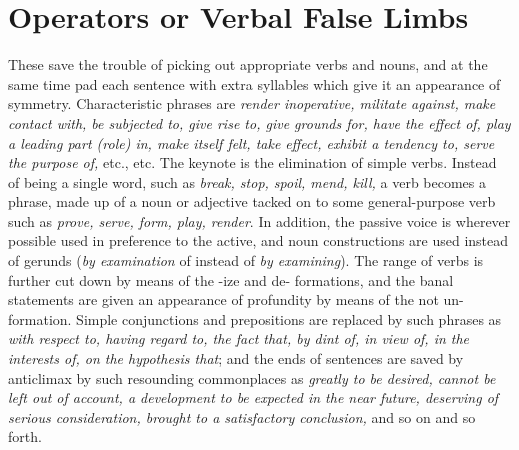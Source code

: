 \documentclass[12pt]{article}
\begin{document}
\section*{Operators or Verbal False Limbs} These save the trouble of picking out appropriate verbs and nouns, and at the same time pad each sentence with extra syllables which give it an appearance of symmetry. Characteristic phrases are \textit{render inoperative, militate against, make contact with, be subjected to, give rise to, give grounds for, have the effect of, play a leading part (role) in, make itself felt, take effect, exhibit a tendency to, serve the purpose of,} etc., etc. The keynote is the elimination of simple verbs. Instead of being a single word, such as \textit{break, stop, spoil, mend, kill,} a verb becomes a phrase, made up of a noun or adjective tacked on to some general-purpose verb such as \textit{prove, serve, form, play, render}. In addition, the passive voice is wherever possible used in preference to the active, and noun constructions are used instead of gerunds (\textit{by examination} of instead of \textit{by examining}). The range of verbs is further cut down by means of the -ize and de- formations, and the banal statements are given an appearance of profundity by means of the not un- formation. Simple conjunctions and prepositions are replaced by such phrases as \textit{with respect to, having regard to, the fact that, by dint of, in view of, in the interests of, on the hypothesis that}; and the ends of sentences are saved by anticlimax by such resounding commonplaces as \textit{greatly to be desired, cannot be left out of account, a development to be expected in the near future, deserving of serious consideration, brought to a satisfactory conclusion,} and so on and so forth.
\end{document}

